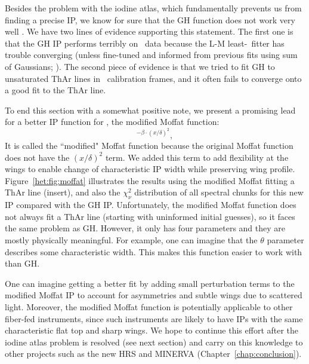 Besides the problem with the iodine atlas, which fundamentally
prevents us from finding a precise IP, we know for sure that the GH
function does not work very well . We have two lines of evidence
supporting this statement. The first one is that the GH IP performs
terribly on \keck\ data because the L-M least-\chisq\ fitter has
trouble converging (unless fine-tuned and informed from previous fits
using sum of Gaussians; \citealt{2013AAS...22114908V}). The second
piece of evidence is that we tried to fit GH to unsaturated ThAr lines
in \het\ calibration frames, and it often fails to converge onto a
good fit to the ThAr line. 

To end this section with a somewhat positive note, we present a
promising lead for a better IP function for \hrs, the modified Moffat
function:
\begin{equation}
[1+(x/\theta)^2]^{-\beta\cdot(x/\delta)^2},
\end{equation} 
It is called the ``modified" Moffat function because the original
Moffat function does not have the $(x/\delta)^2$ term. We added this
term to add flexibility at the wings to enable change of
characteristic IP width while preserving wing
profile. Figure~\ref{het:fig:moffat} illustrates the results using the
modified Moffat fitting a ThAr line (insert), and also the
$\chi^2_\nu$ distribution of all spectral chunks for this new IP
compared with the GH IP. Unfortunately, the modified Moffat function
does not always fit a ThAr line (starting with uninformed initial
guesses), so it faces the same problem as GH. However, it only has
four parameters and they are mostly physically meaningful. For
example, one can imagine that the $\theta$ parameter describes some
characteristic width. This makes this function easier to work with than
GH.

One can imagine getting a better fit by adding small perturbation terms
to the modified Moffat IP to account for asymmetries and subtle wings
due to scattered light. Moreover, the modified Moffat function is
potentially applicable to other fiber-fed instruments, since such
instruments are likely to have IPs with the same characteristic flat
top and sharp wings. We hope to continue this effort after the iodine
atlas problem is resolved (see next section) and carry on this
knowledge to other projects such as the new HRS and MINERVA
(Chapter~\ref{chap:conclusion}).


